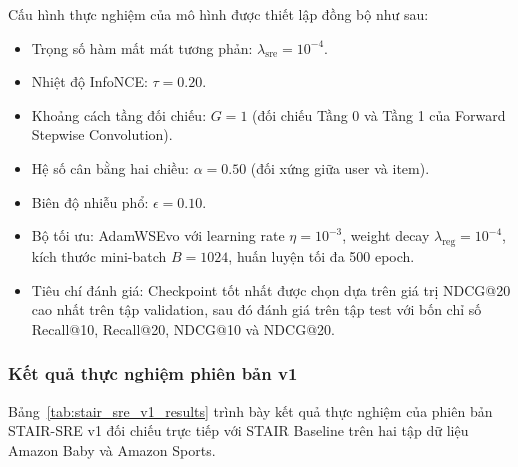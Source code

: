 Cấu hình thực nghiệm của mô hình được thiết lập đồng bộ như sau:
\begin{itemize}[leftmargin=*]
    \item Trọng số hàm mất mát tương phản: $\lambda_{\text{sre}} = 10^{-4}$.
    \item Nhiệt độ InfoNCE: $\tau = 0.20$.
    \item Khoảng cách tầng đối chiếu: $G = 1$ (đối chiếu Tầng 0 và Tầng 1 của Forward Stepwise Convolution).
    \item Hệ số cân bằng hai chiều: $\alpha = 0.50$ (đối xứng giữa user và item).
    \item Biên độ nhiễu phổ: $\epsilon = 0.10$.
    \item Bộ tối ưu: AdamWSEvo với learning rate $\eta = 10^{-3}$, weight decay $\lambda_{\text{reg}} = 10^{-4}$, kích thước mini-batch $B = 1024$, huấn luyện tối đa 500 epoch.
    \item Tiêu chí đánh giá: Checkpoint tốt nhất được chọn dựa trên giá trị NDCG@20 cao nhất trên tập validation, sau đó đánh giá trên tập test với bốn chỉ số Recall@10, Recall@20, NDCG@10 và NDCG@20.
\end{itemize}

\subsubsection{Kết quả thực nghiệm phiên bản v1}

Bảng~\ref{tab:stair_sre_v1_results} trình bày kết quả thực nghiệm của phiên bản STAIR-SRE v1 đối chiếu trực tiếp với STAIR Baseline trên hai tập dữ liệu Amazon Baby và Amazon Sports.

